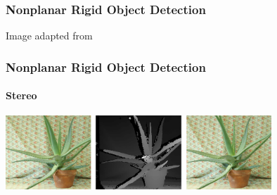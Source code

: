 \documentclass[xetex,professionalfont]{beamer}
\begin{document}

{
\begin{frame}


\end{frame}
}


\begin{frame}\label{sift-object-detection}
\frametitle{Nonplanar Rigid Object Detection}

\begin{center}
    {\centering Image adapted from \cite{lowe2004}}
\end{center}

\end{frame}


\begin{frame}
\frametitle{Nonplanar Rigid Object Detection}
\framesubtitle{Stereo}

\begin{center}
\includegraphics[width=10cm]{figures/opencv-stereo.jpg}
\end{center}

\end{frame}
\end{document}
